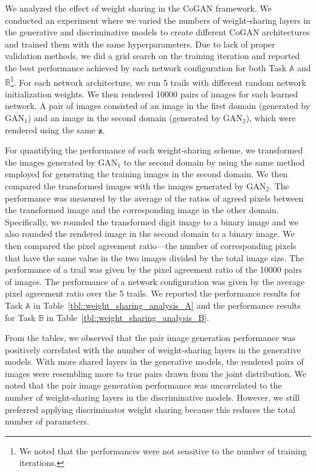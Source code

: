 \documentclass{article}
\begin{document}
We analyzed the effect of weight sharing in the CoGAN framework. We conducted an experiment where we varied the numbers of weight-sharing layers in the generative and discriminative models to create different CoGAN architectures and trained them with the same hyperparameters. Due to lack of proper validation methods, we did a grid search on the training iteration and reported the best performance achieved by each network configuration for both Task $\mathbb{A}$ and $\mathbb{B}$\footnote{We noted that the performances were not sensitive to the number of training iterations.}. For each network architecture, we run 5 trails with different random network initialization weights. We then rendered 10000 pairs of images for each learned network. A pair of images consisted of an image in the first domain (generated by $\text{GAN}_1$) and an image in the second domain (generated by $\text{GAN}_2$), which were rendered using the same $\mathbf{z}$. 

For quantifying the performance of each weight-sharing scheme, we transformed the images generated by $\text{GAN}_1$ to the second domain by using the same method employed for generating the training images in the second domain. We then compared the transformed images with the images generated by $\text{GAN}_2$. The performance was measured by the average of the ratios of agreed pixels between the transformed image and the corresponding image in the other domain. Specifically, we rounded the transformed digit image to a binary image and we also rounded the rendered image in the second domain to a binary image. We then compared the pixel agreement ratio---the number of corresponding pixels that have the same value in the two images divided by the total image size. The performance of a trail was given by the pixel agreement ratio of the 10000 pairs of images. The performance of a network configuration was given by the average pixel agreement ratio over the 5 trails. We reported the performance results for Task $\mathbb{A}$ in Table~\ref{tbl::weight_sharing_analysis_A} and the performance results for Task $\mathbb{B}$ in Table~\ref{tbl::weight_sharing_analysis_B}.

From the tables, we observed that the pair image generation performance was positively correlated with the number of weight-sharing layers in the generative models. With more shared layers in the generative models, the rendered pairs of images were resembling more to true pairs drawn from the joint distribution. We noted that the pair image generation performance was uncorrelated to the number of weight-sharing layers in the discriminative models. However, we still preferred applying discriminator weight sharing because this reduces the total number of parameters. 
\end{document}
